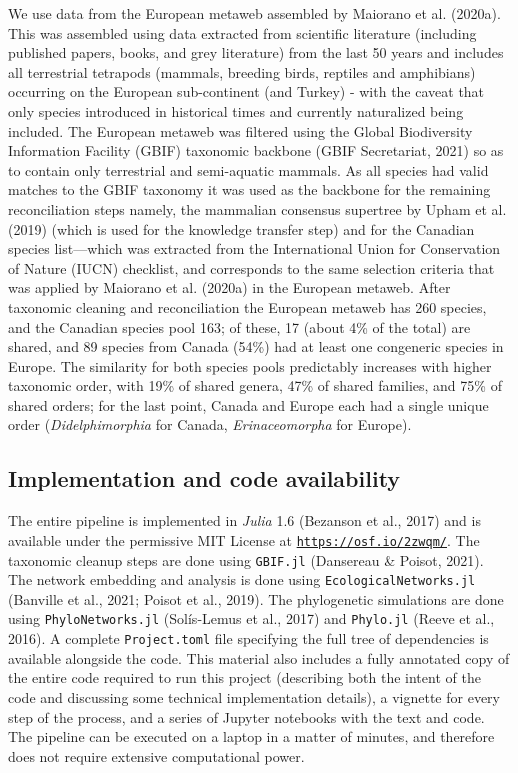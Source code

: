\documentclass[10pt,oneside]{article}
\begin{document}
We use data from the European metaweb assembled by Maiorano et al.
(2020a). This was assembled using data extracted from scientific
literature (including published papers, books, and grey literature) from
the last 50 years and includes all terrestrial tetrapods (mammals,
breeding birds, reptiles and amphibians) occurring on the European
sub-continent (and Turkey) - with the caveat that only species
introduced in historical times and currently naturalized being included.
The European metaweb was filtered using the Global Biodiversity
Information Facility (GBIF) taxonomic backbone (GBIF Secretariat, 2021)
so as to contain only terrestrial and semi-aquatic mammals. As all
species had valid matches to the GBIF taxonomy it was used as the
backbone for the remaining reconciliation steps namely, the mammalian
consensus supertree by Upham et al. (2019) (which is used for the
knowledge transfer step) and for the Canadian species list---which was
extracted from the International Union for Conservation of Nature (IUCN)
checklist, and corresponds to the same selection criteria that was
applied by Maiorano et al. (2020a) in the European metaweb. After
taxonomic cleaning and reconciliation the European metaweb has 260
species, and the Canadian species pool 163; of these, 17 (about 4\% of
the total) are shared, and 89 species from Canada (54\%) had at least
one congeneric species in Europe. The similarity for both species pools
predictably increases with higher taxonomic order, with 19\% of shared
genera, 47\% of shared families, and 75\% of shared orders; for the last
point, Canada and Europe each had a single unique order
(\emph{Didelphimorphia} for Canada, \emph{Erinaceomorpha} for Europe).

\hypertarget{implementation-and-code-availability}{%
\subsection{Implementation and code
availability}\label{implementation-and-code-availability}}

The entire pipeline is implemented in \emph{Julia} 1.6 (Bezanson et al.,
2017) and is available under the permissive MIT License at
\href{https://osf.io/2zwqm/}{\texttt{https://osf.io/2zwqm/}}. The
taxonomic cleanup steps are done using \texttt{GBIF.jl} (Dansereau \&
Poisot, 2021). The network embedding and analysis is done using
\texttt{EcologicalNetworks.jl} (Banville et al., 2021; Poisot et al.,
2019). The phylogenetic simulations are done using
\texttt{PhyloNetworks.jl} (Solís-Lemus et al., 2017) and
\texttt{Phylo.jl} (Reeve et al., 2016). A complete \texttt{Project.toml}
file specifying the full tree of dependencies is available alongside the
code. This material also includes a fully annotated copy of the entire
code required to run this project (describing both the intent of the
code and discussing some technical implementation details), a vignette
for every step of the process, and a series of Jupyter notebooks with
the text and code. The pipeline can be executed on a laptop in a matter
of minutes, and therefore does not require extensive computational
power.
\end{document}
